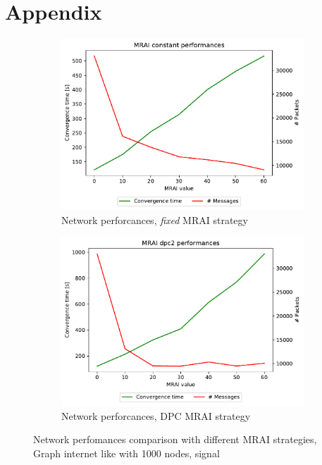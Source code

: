 \chapter{Appendix}

\begin{figure}[h]
     \centering
     \begin{subfigure}[b]{0.45\textwidth}
         \centering
         \includegraphics[width=\textwidth]{images/internet_like/1000/signals/AWAW/constant/internet_like-constant_AWAW_mrai_evolution.pdf}
		 \caption{Network perforcances, \textit{fixed} \ac{MRAI} strategy}
         \label{fig:internet_like_1000_fixed_AWAW}
     \end{subfigure}
     \hfill
     \begin{subfigure}[b]{0.45\textwidth}
         \centering
         \includegraphics[width=\textwidth]{images/internet_like/1000/signals/AWAW/dpc/internet_like-DPC_AWAW_mrai_evolution.pdf}
		 \caption{Network perforcances, \ac{DPC} \ac{MRAI} strategy}
         \label{fig:internet_like_1000_dpc_AWAW}
     \end{subfigure}
	 \caption{Network perfomances comparison with different \ac{MRAI} strategies,
		Graph internet like with \num{1000} nodes, signal }
        \label{fig:internt_like_1000_evolution_AWAW}
\end{figure}

